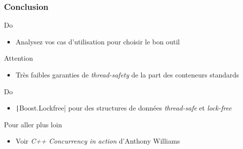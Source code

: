 \documentclass[C++.tex]{subfiles}
\begin{document}
\begin{frame}[fragile]
	\frametitle{Conclusion}
	\begin{exampleblock}{Do}
		\begin{itemize}
			\item Analysez vos cas d'utilisation pour choisir le bon outil
		\end{itemize}
	\end{exampleblock}

	\begin{alertblock}{Attention}
		\begin{itemize}
			\item Très faibles garanties de \textit{thread-safety} de la part des conteneurs standards
		\end{itemize}

	\end{alertblock}

	\begin{exampleblock}{Do}
		\begin{itemize}
			\item \texttt|Boost.Lockfree| pour des structures de données \textit{thread-safe} et \textit{lock-free}
		\end{itemize}
	\end{exampleblock}

	\begin{block}{Pour aller plus loin}
		\begin{itemize}
			\item Voir \textit{C++ Concurrency in action} d'Anthony Williams
		\end{itemize}

	\end{block}
\end{frame}
\end{document}

